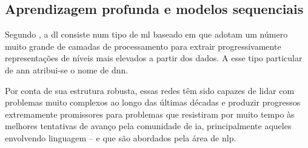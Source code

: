 
\subsection{Aprendizagem profunda e modelos sequenciais}
\label{sec:am-ap}

Segundo , a \acrfull{dl} consiste num tipo de \acrlong{ml} baseado em  que adotam um número muito grande de camadas de processamento para extrair progressivamente representações de níveis mais elevados a partir dos dados.
A esse tipo particular de \acrshort{ann} atribui-se o nome de \acrfull{dnn}.

Por conta de sua estrutura robusta, essas redes têm sido capazes de lidar com problemas muito complexos ao longo das últimas décadas e produzir progressos extremamente promissores para problemas que resistiram por muito tempo às melhores tentativas de avanço pela comunidade de \acrshort{ia}, principalmente aqueles envolvendo linguagem -- e que são abordados pela área de \acrfull{nlp}.







